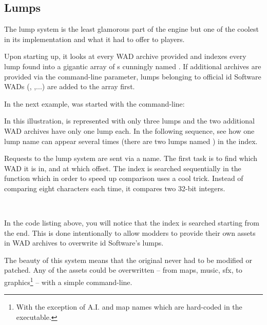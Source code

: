 \subsection{Lumps} \label{wad_detailled}
The lump system is the least glamorous part of the engine but one of the coolest in its implementation and what it had to offer to players.\\
\par
Upon starting up, it looks at every WAD archive provided and indexes every lump found into a gigantic array of s cunningly named . 
If additional archives are provided via the  command-line parameter, lumps belonging to official id Software WADs (, ,...) are added to the  array first.\\
\par
In the next example, \doom{} was started with the command-line:\\
\par
{}
\par
In this illustration,  is represented with only three lumps and the two additional WAD archives have only one lump each. In the following sequence, see how one lump name can appear several times (there are two lumps named ) in the index.\\
\par
{}
\par
Requests to the lump system are sent via a  name. The first task is to find which WAD it is in, and at which offset. The index is searched sequentially in the function  which in order to speed up comparison uses a cool trick. Instead of comparing eight characters each time, it compares two 32-bit integers.\\
\par
{}\\
\par
In the code listing above, you will notice that the index is searched starting from the end. This is done intentionally to allow modders to provide their own assets in WAD archives to overwrite id Software's lumps.\\
\par
The beauty of this system means that the original  never had to be modified or patched. Any of the assets could be overwritten -- from maps, music, sfx, to graphics\footnote{With the exception of A.I. and map names which are hard-coded in the executable.} -- with a simple command-line.\\
